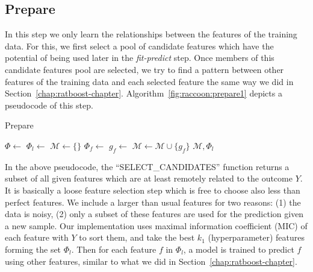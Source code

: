\subsection{Prepare}
In this step we only learn the relationships between the features of the training data. For this, we first select a pool of candidate features which have the potential of being used later in the \emph{fit-predict} step. Once members of this candidate features pool are selected, we try to find a pattern between other features of the training data and each selected feature the same way we did in Section~\ref{chap:ratboost-chapter}. Algorithm~\ref{fig:raccoon:prepare1} depicts a pseudocode of this step.

\begin{algorithm}
\caption{Prepare}
\label{fig:raccoon:prepare1}
\begin{algorithmic}[1]
    \State $\Phi \gets $ 
    \State $\Phi_l \gets $ 
    \State $\mathcal{M} \gets \{\}$
        \State $\Phi_f \gets $ 
        \State $g_f \gets $ 
        \State $\mathcal{M} \gets \mathcal{M} \cup \{g_f\}$
    \EndFor
    \State \Return $\mathcal{M}, \Phi_l$
\EndFunction
\end{algorithmic}
\end{algorithm}

In the above pseudocode, the ``SELECT\_CANDIDATES'' function returns a subset of all given features which are at least remotely related to the outcome $Y$. It is basically a loose feature selection step which is free to choose also less than perfect features. We include a larger than usual features for two reasons: (1) the data is noisy, (2) only a subset of these features are used for the prediction given a new sample. Our implementation uses maximal information coefficient (MIC) of each feature with $Y$ to sort them, and take the best $k_1$ (hyperparameter) features forming the set $\Phi_l$. Then for each feature $f$ in $\Phi_l$, a model is trained to predict $f$ using other features, similar to what we did in Section~\ref{chap:ratboost-chapter}.

